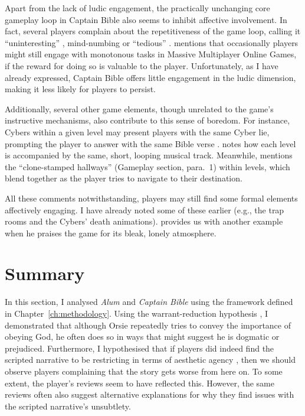 Apart from the lack of ludic engagement, the practically unchanging core gameplay loop in Captain Bible also seems to inhibit affective involvement. In fact, several players complain about the repetitiveness of the game loop, calling it ``uninteresting'' \parencite[The Bad section, para. 2]{turblescelbor_captain_2025}, mind-numbing \parencite[para. 3]{ace101_an_2013} or ``tedious'' \parencite[Gameplay section, para. 1]{annk526_captain_2024}.
\textcite[162]{calleja_in_game_2011} mentions that occasionally players might still engage with monotonous tasks in Massive Multiplayer Online Games, if the reward for doing so is valuable to the player. Unfortunately, as I have already expressed, Captain Bible offers little engagement in the ludic dimension, making it less likely for players to persist.

Additionally, several other game elements, though unrelated to the game’s instructive mechanisms, also contribute to this sense of boredom. For instance, Cybers within a given level may present players with the same Cyber lie, prompting the player to answer with the same Bible verse \parencite[7:44]{brutalmoose_captain_2014}.
\textcite[para. 6]{ace101_an_2013} notes how each level is accompanied by the same, short, looping musical track.
Meanwhile, \textcite{annk526_captain_2024} mentions the “clone-stamped hallways” (Gameplay section, para.~1) within levels, which blend together as the player tries to navigate to their destination. 

All these comments notwithstanding, players may still find some formal elements affectively engaging. I have already noted some of these earlier (e.g., the trap rooms and the Cybers' death animations). \textcite[Aesthetics section]{censorious_idler_captain_2018} provides us with another example when he praises the game for its bleak, lonely atmosphere.


\section{Summary}
In this section, I analysed \textit{Alum} \parencite{orsie_alum_2006} and \textit{Captain Bible} \parencite{engelbrite_captain_1994} using the framework defined in Chapter~\ref{ch:methodology}. Using the warrant-reduction hypothesis \parencite{repp_whats_2012}, I demonstrated that although Orsie repeatedly tries to convey the importance of obeying God, he often does so in ways that might suggest he is dogmatic or prejudiced. Furthermore, I hypothesised that if players did indeed find the scripted narrative to be restricting in terms of aesthetic agency \parencite{king_virtue_2017}, then we should observe players complaining that the story gets worse from here on. To some extent, the player’s reviews seem to have reflected this. However, the same reviews often also suggest alternative explanations for why they find issues with the scripted narrative’s unsubtlety.

